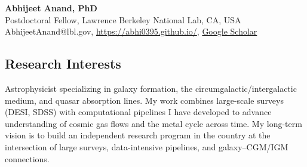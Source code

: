 \documentclass[12pt,letterpaper]{article}
\begin{document}
\thispagestyle{empty}\sloppy\sloppypar\raggedbottom

\textbf{\Large Abhijeet Anand, PhD}\\[0.5ex]
Postdoctoral Fellow, Lawrence Berkeley National Lab, CA, USA\\[0.5ex]
\textsf{\small AbhijeetAnand@lbl.gov, \href{https://abhi0395.github.io/}{https://abhi0395.github.io/}, \href{https://scholar.google.com/citations?hl=en&user=MfOuq1IAAAAJ}{Google Scholar}}\\[0.5ex]

\subsection{Research Interests}

Astrophysicist specializing in galaxy formation, the circumgalactic/intergalactic medium, and quasar absorption lines. My work combines large-scale surveys (DESI, SDSS) with computational pipelines I have developed to advance understanding of cosmic gas flows and the metal cycle across time. My long-term vision is to build an independent research program in the country at the intersection of large surveys, data-intensive pipelines, and galaxy–CGM/IGM connections.

\vspace{-1.5mm}
\end{document}
